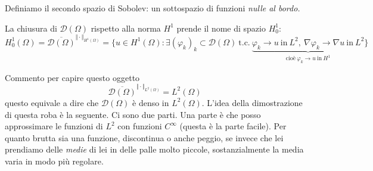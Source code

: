 Definiamo il secondo spazio di Sobolev: un sottospazio di funzioni \textit{nulle al bordo.}
\begin{definition}
    La chiusura di $\mathcal{D}(\Omega)$ rispetto alla norma $H^{1}$ prende il nome di spazio $H^{1}_{0}$:
    \begin{equation*}
        H^{1}_{0}(\Omega) =\overline{\mathcal{D}(\Omega)}^{\Vert \cdotp \Vert _{H^{1}(\Omega)}}
        =\bigg\{u\in H^{1}(\Omega) :\exists (\varphi _{k})_{k} \subset \mathcal{D}(\Omega) \ \text{t.c.} \ \underbrace{\varphi _{k}\rightarrow u\ \text{in} \ L^{2} ,\ \nabla \varphi _{k}\rightarrow \nabla u\ \text{in} \ L^{2}}_{\text{cioè} \ \varphi _{k}\rightarrow u\ \text{in} \ H^{1}}\bigg\}
    \end{equation*}
\end{definition}
Commento per capire questo oggetto
\begin{equation*}
    \overline{\mathcal{D}(\Omega)}^{\Vert \cdotp \Vert _{L^{2}(\Omega)}} =L^{2}(\Omega)
\end{equation*}
questo equivale a dire che $\mathcal{D}(\Omega)$ è denso in $L^{2}(\Omega)$. L'idea della dimostrazione di questa roba è la seguente. Ci sono due parti. Una parte è che posso approssimare le funzioni di $L^{2}$ con funzioni $C^{\infty }$ (questa è la parte facile). Per quanto brutta sia una funzione, discontinua o anche peggio, se invece che lei prendiamo delle \textit{medie} di lei in delle palle molto piccole, sostanzialmente la media varia in modo più regolare.

